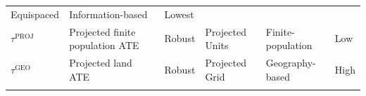 \documentclass[letter]{article}
\newcommand{\tauproj}{\tau^{\mathrm{PROJ}}}
\newcommand{\taugeo}{\tau^{\mathrm{GEO}}}
\begin{document}
\begin{longtable}[]{@{}llllll@{}}
\begin{minipage}[t]{0.13\columnwidth}
Equispaced\strut
\end{minipage} & \begin{minipage}[t]{0.15\columnwidth}\raggedright\strut
Information-based\strut
\end{minipage} & \begin{minipage}[t]{0.08\columnwidth}\raggedright\strut
Lowest\strut
\end{minipage}\tabularnewline
\begin{minipage}[t]{0.09\columnwidth}\raggedright\strut
\(\tauproj\)\strut
\end{minipage} & \begin{minipage}[t]{0.25\columnwidth}\raggedright\strut
Projected finite population ATE\strut
\end{minipage} & \begin{minipage}[t]{0.13\columnwidth}\raggedright\strut
Robust\strut
\end{minipage} & \begin{minipage}[t]{0.13\columnwidth}\raggedright\strut
Projected Units\strut
\end{minipage} & \begin{minipage}[t]{0.15\columnwidth}\raggedright\strut
Finite-population\strut
\end{minipage} & \begin{minipage}[t]{0.08\columnwidth}\raggedright\strut
Low\strut
\end{minipage}\tabularnewline
\begin{minipage}[t]{0.09\columnwidth}\raggedright\strut
\(\taugeo\)\strut
\end{minipage} & \begin{minipage}[t]{0.25\columnwidth}\raggedright\strut
Projected land ATE\strut
\end{minipage} & \begin{minipage}[t]{0.13\columnwidth}\raggedright\strut
Robust\strut
\end{minipage} & \begin{minipage}[t]{0.13\columnwidth}\raggedright\strut
Projected Grid\strut
\end{minipage} & \begin{minipage}[t]{0.15\columnwidth}\raggedright\strut
Geography-based\strut
\end{minipage} & \begin{minipage}[t]{0.08\columnwidth}\raggedright\strut
High\strut
\end{minipage}\tabularnewline
\begin{minipage}[t]{0.09\columnwidth}\raggedright\strut

\end{minipage}
\end{longtable}
\end{document}
